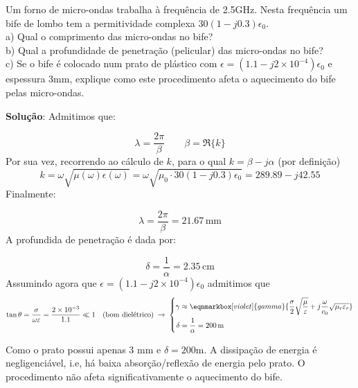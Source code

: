 \vspace{-1em}
\begin{question}
    Um forno de micro-ondas trabalha à frequência de 2.5GHz. Nesta frequência um bife de lombo tem a permitividade complexa $30(1 - j0.3)\epsilon_0$.\\[3pt] 
    a) Qual o comprimento das micro-ondas no bife?\\[3pt] 
    b) Qual a profundidade de penetração (pelicular) das micro-ondas no bife?\\[3pt] 
    c) Se o bife é colocado num prato de plástico com $\epsilon=(1.1-j2\times10^{-4})\epsilon_0$ e espessura $3$mm, explique como este procedimento afeta o aquecimento do bife pelas micro-ondas.
    
    \questionSep
    \textbf{Solução}: Admitimos que:

    \vspace{-1.5em}
    $$
        \lambda = \frac{2\pi}{\beta}\qquad \beta = \Re\{k\}
    $$
    Por sua vez, recorrendo ao cálculo de $k$, para o qual $k = \beta - j\alpha$ (por definição)
    $$
        k = \omega\sqrt{\mu(\omega)\epsilon(\omega)}
        = \omega\sqrt{\mu_0\cdot 30(1 - j0.3)\epsilon_0} = 289.89 - j42.55
    $$
    Finalmente:

    \vspace{-1.5em}
    $$
        \lambda = \frac{2\pi}{\beta} = 21.67\,\text{mm}
    $$
    A profundida de penetração é dada por:

    \vspace{-1em}
    $$
        \delta = \frac{1}{\alpha} = 2.35\,\text{cm}
    $$
    Assumindo agora que $\epsilon=(1.1-j2\times10^{-4})\epsilon_0$ admitimos que
    $$
        \tan\theta = \frac{\sigma}{\omega\epsilon} = \frac{2\times 10^{-3}}{1.1} \ll 1\quad \text{(bom dielétrico)}\;\rightarrow\;
         \left\{
            \begin{aligned}
                 \gamma &\approx \eqnmarkbox[violet]{gamma}{\frac{\sigma}{2}\sqrt{\frac{\mu}{\epsilon}} + j\frac{\omega}{c_0}\sqrt{\mu_r\epsilon_r}}\\
                 \delta &= \frac{1}{\alpha} = 200\,\text{m}
            \end{aligned}\right.
    $$

    Como o prato possui apenas 3 mm e $\delta = 200$m. A dissipação de energia é negligenciável, i.e, há baixa absorção/reflexão de energia pelo prato. O procedimento não afeta significativamente o aquecimento do bife.
\end{question}
\clearpage

